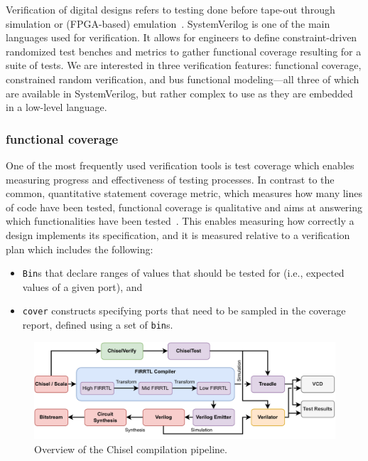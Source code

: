 \documentclass[conference]{IEEEtran}
\begin{document}
Verification of digital designs refers to testing done before tape-out through simulation 
or (FPGA-based) emulation~\cite{spear2008systemverilog}. SystemVerilog is one 
of the main languages used for verification. It allows for engineers to define constraint-driven 
randomized test benches and metrics to gather functional coverage resulting for a suite of 
tests. We are interested in three verification features: functional coverage, 
constrained random verification, and bus functional modeling---all three of which are available in 
SystemVerilog, but rather complex to use as they are embedded in a low-level language.

\subsubsection{functional coverage}
One of the most frequently used verification tools is test coverage which enables measuring 
progress and effectiveness of testing processes. In contrast to the common, quantitative statement 
coverage metric, which measures how many lines of code have been tested, functional coverage is 
qualitative and aims at answering which functionalities have been 
tested~\cite{spear2008systemverilog}. This enables measuring how correctly a design implements its 
specification, and it is measured relative to a verification plan which includes the following:

\begin{itemize}
  \item \texttt{Bin}s that declare ranges of values that should be tested for (i.e., expected values of a given port), and 
  \item \texttt{cover} constructs specifying ports that need to be sampled in the coverage report, defined using a set of \texttt{bin}s.
\end{itemize}

\begin{figure}
  \centering
    \includegraphics[width=0.8\linewidth]{Chisel_FIRRTL_VERILOG.pdf}
    \caption{Overview of the Chisel compilation pipeline.}
\label{fig:chisel-pipe}
\end{figure}
\end{document}
